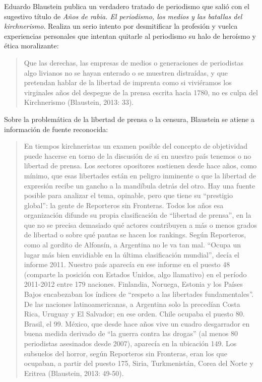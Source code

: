 Eduardo Blaustein publica un verdadero tratado de periodismo que salió con el sugestivo título de \emph{Años de rabia. El periodismo, los medios y las batallas del kirchnerismo}. Realiza un serio intento por desmitificar la profesión y vuelca experiencias personales que intentan quitarle al periodismo su halo de heroísmo y ética moralizante:

\begin{quote}
Que las derechas, las empresas de medios o generaciones de periodistas algo livianos no se hayan enterado o se muestren distraídas, y que pretendan hablar de la libertad de imprenta como si viviéramos los virginales años del despegue de la prensa escrita hacia 1780, no es culpa del Kirchnerismo (Blaustein, 2013: 33).
\end{quote}

Sobre la problemática de la libertad de prensa o la censura, Blaustein se atiene a información de fuente reconocida:

\begin{quote}
En tiempos kirchneristas un examen posible del concepto de objetividad puede hacerse en torno de la discusión de si en nuestro país tenemos o no libertad de prensa. Los sectores opositores sostienen desde hace años, como mínimo, que esas libertades están en peligro inminente o que la libertad de expresión recibe un gancho a la mandíbula detrás del otro. Hay una fuente posible para analizar el tema, opinable, pero que tiene su ``prestigio global'': la gente de Reporteros sin Fronteras. Todos los años esa organización difunde su propia clasificación de ``libertad de prensa'', en la que no se precisa demasiado qué actores contribuyen a más o menos grados de libertad o sobre qué pautas se hacen los rankings. Según Reporteros, como al gordito de Alfonsín, a Argentina no le va tan mal. ``Ocupa un lugar más bien envidiable en la última clasificación mundial'', decía el informe 2011. Nuestro país aparecía en ese informe en el puesto 48 (comparte la posición con Estados Unidos, algo llamativo) en el período 2011-2012 entre 179 naciones. Finlandia, Noruega, Estonia y los Países Bajos encabezaban los índices de ``respeto a las libertades fundamentales''. De las naciones latinoamericanas, a Argentina solo la precedían Costa Rica, Uruguay y El Salvador; en ese orden. Chile ocupaba el puesto 80. Brasil, el 99. México, que desde hace años vive un cuadro desgarrador en buena medida derivado de ``la guerra contra las drogas'' (al menos 80 periodistas asesinados desde 2007), aparecía en la ubicación 149. Los subsuelos del horror\textquotesingle, según Reporteros sin Fronteras, eran los que ocupaban, a partir del puesto 175, Siria, Turkmenistán, Corea del Norte y Eritrea (Blaustein, 2013: 49-50).
\end{quote}

